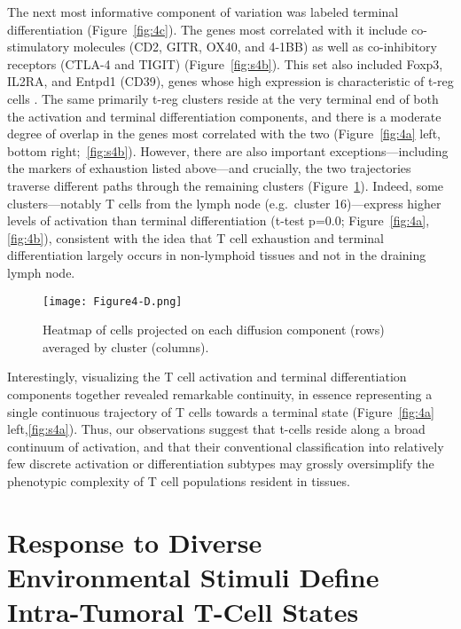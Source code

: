 The next most informative component of variation was labeled terminal differentiation (Figure~\ref{fig:4c}). 
The genes most correlated with it include co-stimulatory molecules (CD2, GITR, OX40, and 4-1BB) as well as co-inhibitory receptors (CTLA-4 and TIGIT) (Figure~\ref{fig:s4b}).
This set also included Foxp3, IL2RA, and Entpd1 (CD39), genes whose high expression is characteristic of t-reg cells \citep{Josefowicz2012}.
The same primarily t-reg clusters reside at the very terminal end of both the activation and terminal differentiation components, and there is a moderate degree of overlap in the genes most correlated with the two (Figure~\ref{fig:4a} left, bottom right;~\ref{fig:s4b}).
However, there are also important exceptions---including the markers of exhaustion listed above---and crucially, the two trajectories traverse different paths through the remaining clusters (Figure~\ref{fig:4d}).
Indeed, some clusters---notably T cells from the lymph node (e.g.\ cluster 16)---express higher levels of activation than terminal differentiation (t-test p=0.0; Figure~\ref{fig:4a},\ref{fig:4b}), consistent with the idea that T cell exhaustion and terminal differentiation largely occurs in non-lymphoid tissues and not in the draining lymph node.

\begin{figure}
\centering
\texttt{[image: Figure4-D.png]}
\caption{Heatmap of cells projected on each diffusion component (rows) averaged by cluster (columns).
}
\label{fig:4d}
\end{figure}

Interestingly, visualizing the T cell activation and terminal differentiation components together revealed remarkable continuity, in essence representing a single continuous trajectory of T cells towards a terminal state (Figure~\ref{fig:4a} left,\ref{fig:s4a}).
Thus, our observations suggest that t-cells reside along a broad continuum of activation, and that their conventional classification into relatively few discrete activation or differentiation subtypes may grossly oversimplify the phenotypic complexity of T cell populations resident in tissues.

\section{Response to Diverse Environmental Stimuli Define Intra-Tumoral T-Cell States}

